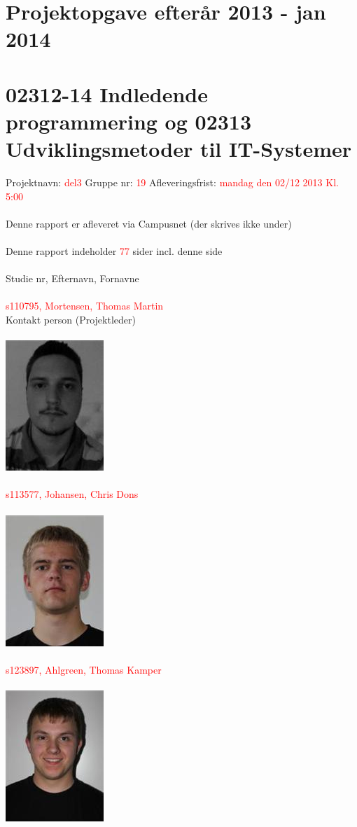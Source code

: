 \documentclass{article}
\begin{document}
\section*{Projektopgave efterår 2013 - jan 2014}
\section*{02312-14 Indledende programmering og 02313 Udviklingsmetoder til IT-Systemer}
Projektnavn: \textcolor{red}{del3}
Gruppe nr: \textcolor{red}{19}
Afleveringsfrist: \textcolor{red}{mandag den 02/12 2013 Kl. 5:00}
\\\\
Denne rapport er afleveret via Campusnet (der skrives ikke under)
\\\\
Denne rapport indeholder \textcolor{red}{77} sider incl. denne side
\\\\
Studie nr, Efternavn, Fornavne
\\\\
\textcolor{red}{s110795, Mortensen, Thomas Martin}
\\
Kontakt person (Projektleder)
\\\\
\includegraphics[scale=0.5]{ThomasM.jpg}
\\\\
\textcolor{red}{s113577, Johansen, Chris Dons}
\\\\
\includegraphics[scale=0.5]{ChrisJ.jpg}
\\\\
\textcolor{red}{s123897, Ahlgreen, Thomas Kamper}
\\\\
\includegraphics[scale=0.5]{ThomasA.jpg}
\newpage
\end{document}
